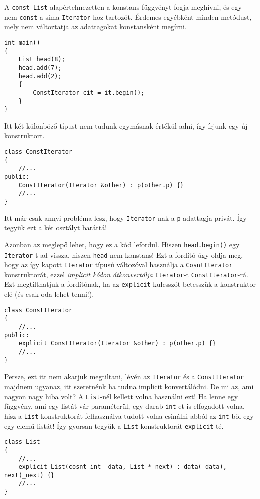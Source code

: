 \documentclass[a4paper,11.5pt]{article}
\begin{document}
	A \texttt{const List} alapértelmezetten a konstans függvényt fogja meghívni, és egy nem \texttt{const} a sima \texttt{Iterator}-hoz tartozót. Érdemes egyébként minden metódust, mely nem változtatja az adattagokat konstansként megírni. 
	\begin{lstlisting}
int main()
{
	List head(8);
	head.add(7);
	head.add(2);
	{
		ConstIterator cit = it.begin();
	}
}
	\end{lstlisting}
	Itt két különböző típust nem tudunk egymásnak értékül adni, így írjunk egy új konstruktort.
	\begin{lstlisting}
class ConstIterator
{
	//...
public:
	ConstIterator(Iterator &other) : p(other.p) {}
	//...
}
	\end{lstlisting}
	Itt már csak annyi probléma lesz, hogy \texttt{Iterator}-nak a \texttt{p} adattagja privát. Így tegyük ezt a két osztályt baráttá!
	
	Azonban az meglepő lehet, hogy ez a kód lefordul. Hiszen \texttt{head.begin()} egy \texttt{Iterator}-t ad vissza, hiszen \texttt{head} nem konstans! Ezt a fordító úgy oldja meg, hogy az így kapott \texttt{Iterator} típusú változóval használja a \texttt{CosntIterator} konstruktorát, ezzel \textit{implicit kódon átkonvertálja} \texttt{Iterator}-t \texttt{ConstIterator}-rá. Ezt megtilthatjuk a fordítónak, ha az \texttt{explicit} kulcsszót betesszük a konstruktor elé (és csak oda lehet tenni!).
\begin{lstlisting}
class ConstIterator
{
	//...
public:
	explicit ConstIterator(Iterator &other) : p(other.p) {}
	//...
}
\end{lstlisting}
	Persze, ezt itt nem akarjuk megtiltani, lévén az \texttt{Iterator} és a \texttt{ConstIterator} majdnem ugyanaz, itt szeretnénk ha tudna implicit konvertálódni. De mi az, ami nagyon nagy hiba volt? A \texttt{List}-nél kellett volna használni ezt! Ha lenne egy függvény, ami egy listát vár paraméterül, egy darab \texttt{int}-et is elfogadott volna, hisz a \texttt{List} konstruktorát felhasználva tudott volna csinálni abból az \texttt{int}-ből egy egy elemű listát! Így gyorsan tegyük a \texttt{List} konstruktorát \texttt{explicit}-té.
	\begin{lstlisting}
class List
{
	//...
	explicit List(cosnt int _data, List *_next) : data(_data), next(_next) {}
	//...
}
	\end{lstlisting}
\end{document}
